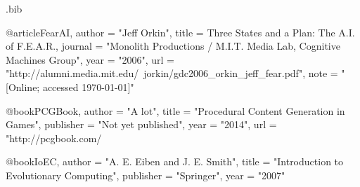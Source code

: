 \begin{filecontents*}{\jobname.bib}

@article{FearAI,
	author	= "Jeff Orkin",
	title		= {Three States and a Plan: The {A}.{I}. of {F}.{E}.{A}.{R}.},
	journal	= "Monolith Productions / M.I.T. Media Lab, Cognitive Machines Group",
	year		= "2006",
	url 		= "http://alumni.media.mit.edu/~jorkin/gdc2006\_orkin\_jeff\_fear.pdf",
	note		= "[Online; accessed \today]"
}

@book{PCGBook,
	author 	= "A lot",
	title 		= "Procedural Content Generation in Games",
	publisher 	= "Not yet published",
	year 		= "2014",
	url 		= "http://pcgbook.com/
}

@book{IoEC,
	author 	= "A. E. Eiben and J. E. Smith",
	title 		= "Introduction to Evolutionary Computing",
	publisher 	= "Springer",
	year 		= "2007"
}

\end{filecontents*}

\nocite{*}
